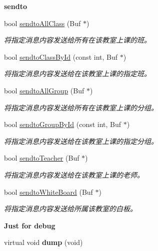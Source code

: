 \begin{Indent}{\bf sendto}\par
\begin{DoxyCompactItemize}
\item 
bool \hyperlink{classepClassroom_a79ca2de7b930a2edfe0e74ca4d6bb747}{sendto\-All\-Class} (\-Buf $\ast$)
\begin{DoxyCompactList}\small\item\em 将指定消息内容发送给所有在该教室上课的班。 \end{DoxyCompactList}\item 
bool \hyperlink{classepClassroom_a71cea25c521ada2a477af1b4e70004a4}{sendto\-Class\-By\-Id} (const int, \-Buf $\ast$)
\begin{DoxyCompactList}\small\item\em 将指定消息内容发送给在该教室上课的指定班。 \end{DoxyCompactList}\item 
bool \hyperlink{classepClassroom_a1ff71a89242fe0be7ed1b876abb2d1e0}{sendto\-All\-Group} (\-Buf $\ast$)
\begin{DoxyCompactList}\small\item\em 将指定消息内容发送给所有在该教室上课的分组。 \end{DoxyCompactList}\item 
bool \hyperlink{classepClassroom_a23ccb0fbff2209acbe62b77d4f5b09f0}{sendto\-Group\-By\-Id} (const int, \-Buf $\ast$)
\begin{DoxyCompactList}\small\item\em 将指定消息内容发送给在该教室上课的指定分组。 \end{DoxyCompactList}\item 
bool \hyperlink{classepClassroom_a87cf885ac68c8905410b422832b28e3d}{sendto\-Teacher} (\-Buf $\ast$)
\begin{DoxyCompactList}\small\item\em 将指定消息内容发送给在该教室上课的老师。 \end{DoxyCompactList}\item 
bool \hyperlink{classepClassroom_ab12f803a2e7a1954b9198498d6dd95c8}{sendto\-White\-Board} (\-Buf $\ast$)
\begin{DoxyCompactList}\small\item\em 将指定消息内容发送给所属该教室的白板。 \end{DoxyCompactList}\end{DoxyCompactItemize}
\end{Indent}
\begin{Indent}{\bf \-Just for debug}\par
\begin{DoxyCompactItemize}
\item 
\hypertarget{classepClassroom_af9e52d6f2793e718c1f4d6dd14ebb7e2}{virtual void {\bfseries dump} (void)}\label{classepClassroom_af9e52d6f2793e718c1f4d6dd14ebb7e2}

\end{DoxyCompactItemize}
\end{Indent}


